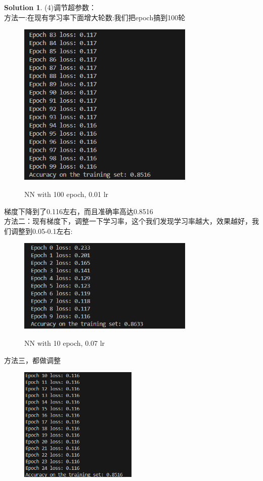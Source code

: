 \documentclass[a4paper,UTF8]{article}
\numberwithin{equation}{section}
\theoremstyle{definition}
\newtheorem*{solution}{Solution}
\begin{document}
\begin{solution}
(4)调节超参数：\\
方法一:在现有学习率下面增大轮数:我们把epoch搞到100轮\\
\begin{figure}[H]
    \centering
    \includegraphics[width=0.75\textwidth]{4.png}\\
    \caption{NN with 100 epoch, 0.01 lr}
    \label{fig:NN with 100 epoch, 0.01 lr}
\end{figure}  
梯度下降到了0.116左右，而且准确率高达0.8516\\
方法二：现有梯度下，调整一下学习率，这个我们发现学习率越大，效果越好，我们调整到0.05-0.1左右:\\
\begin{figure}[H]
    \centering
    \includegraphics[width=0.75\textwidth]{5.png}\\
    \caption{NN with 10 epoch, 0.07 lr}
    \label{fig:NN with 10 epoch, 0.07 lr}
\end{figure} 
方法三，都做调整\\
\begin{figure}[H]
    \centering
    \includegraphics[width=0.5\textwidth]{6.png}\\

\end{figure}
\end{solution}
\end{document}
